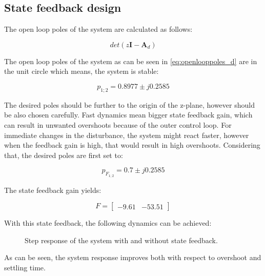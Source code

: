 \subsection{State feedback design}
\label{statfeedback_d}

The open loop poles of the system are calculated as follows: 

\begin{equation}
  \label{eq:feedbackd}
    det(z\mathbf{I}-\mathbf{A}_d)
  \end{equation}

The open loop poles of the system as can be seen in \eqref{eq:openlooppoles_d} are in the unit circle which means, the system is stable: 

\begin{equation}
  \label{eq:openlooppoles_d}
  p_{{1;2}} = 0.8977 \pm j0.2585
  \end{equation}

The desired poles should be further to the origin of the z-plane, however should be also chosen carefully. Fast dynamics mean bigger state feedback gain, which can result in unwanted overshoots because of the outer control loop. For immediate changes in the disturbance, the system might react faster, however when the feedback gain is high, that would result in high overshoots. Considering that, the desired poles are first set to: 

\begin{equation}
  \label{eq:openlooppoles_d}
  p_{F_{1;2}} = 0.7 \pm j0.2585
  \end{equation} 
  
The state feedback gain yields: 
  
  \begin{equation}
\label{eq:F_d}
    F
=
 \begin{bmatrix}
    -9.61 & -53.51
\end{bmatrix}
\end{equation}
  
  With this state feedback, the following dynamics can be achieved:
  
\begin{figure}[H]
\centering

\caption{Step response of the system with and without state feedback.}
\label{fig:statefeedback_d}
\end{figure}

As can be seen, the system response improves both with respect to overshoot and settling time. 
  
  
